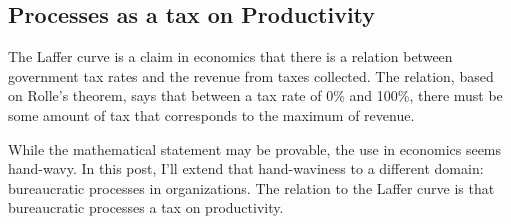 
\subsection{Processes as a tax on Productivity}

The Laffer curve is a claim in economics that there is a relation between government tax rates and the revenue from taxes collected. The relation, based on Rolle's theorem, says that between a tax rate of 0\% and 100\%, there must be some amount of tax that corresponds to the maximum of revenue. 

While the mathematical statement may be provable, the use in economics seems hand-wavy. In this post, I'll extend that hand-waviness to a different domain: bureaucratic processes in organizations. The relation to the Laffer curve is that bureaucratic processes a tax on productivity. 